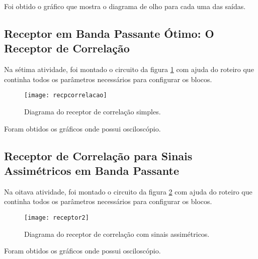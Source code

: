 Foi obtido o gráfico que mostra o diagrama de olho para cada uma das saídas.


\subsection{Receptor em Banda Passante Ótimo: O Receptor de Correlação}
Na sétima atividade, foi montado o circuito da figura \ref{fig:receptorcorr} com ajuda do roteiro que continha todos os parâmetros necessários para configurar os blocos.

\begin{figure}[H]
    \centering
    \texttt{[image: recpcorrelacao]}
    \caption{Diagrama do receptor de correlação simples.}
    \label{fig:receptorcorr}
\end{figure}

Foram obtidos os gráficos onde possui osciloscópio.


\subsection{Receptor de Correlação para Sinais Assimétricos em Banda Passante}
Na oitava atividade, foi montado o circuito da figura \ref{fig:rec2} com ajuda do roteiro que continha todos os parâmetros necessários para configurar os blocos.

\begin{figure}[H]
    \centering
    \texttt{[image: receptor2]}
    \caption{Diagrama do receptor de correlação com sinais assimétricos.}
    \label{fig:rec2}
\end{figure}

Foram obtidos os gráficos onde possui osciloscópio.